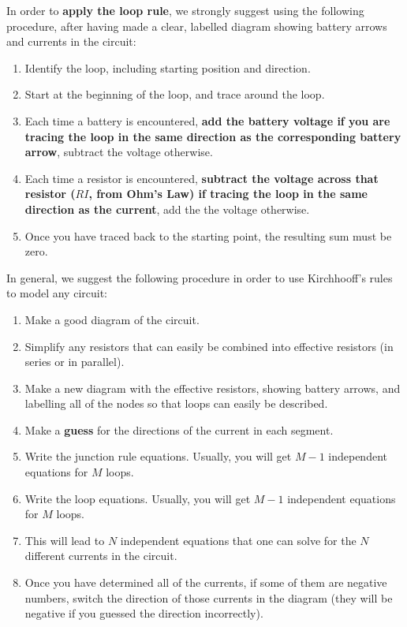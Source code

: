 \begin{chapterSummary}
In order to \textbf{apply the loop rule}, we strongly suggest using the following procedure, after having made a clear, labelled diagram showing battery arrows and currents in the circuit:
\begin{enumerate}
\item Identify the loop, including starting position and direction.
\item Start at the beginning of the loop, and trace around the loop.
\item Each time a battery is encountered, \textbf{add the battery voltage if you are tracing the loop in the same direction as the corresponding battery arrow}, subtract the voltage otherwise.
\item Each time a resistor is encountered, \textbf{subtract the voltage across that resistor ($RI$, from Ohm's Law) if tracing the loop in the same direction as the current}, add the the voltage otherwise.
\item Once you have traced back to the starting point, the resulting sum must be zero.
\end{enumerate}

In general, we suggest the following procedure in order to use Kirchhooff's rules to model any circuit:
\begin{enumerate}
\item Make a good diagram of the circuit.
\item Simplify any resistors that can easily be combined into effective resistors (in series or in parallel).
\item Make a new diagram with the effective resistors, showing battery arrows, and labelling all of the nodes so that loops can easily be described.
\item Make a \textbf{guess} for the directions of the current in each segment.
\item Write the junction rule equations. Usually, you will get $M-1$ independent equations for $M$ loops.
\item Write the loop equations. Usually, you will get $M-1$ independent equations for $M$ loops.
\item This will lead to $N$ independent equations that one can solve for the $N$ different currents in the circuit.
\item Once you have determined all of the currents, if some of them are negative numbers, switch the direction of those currents in the diagram (they will be negative if you guessed the direction incorrectly).
\end{enumerate}


\end{chapterSummary}
